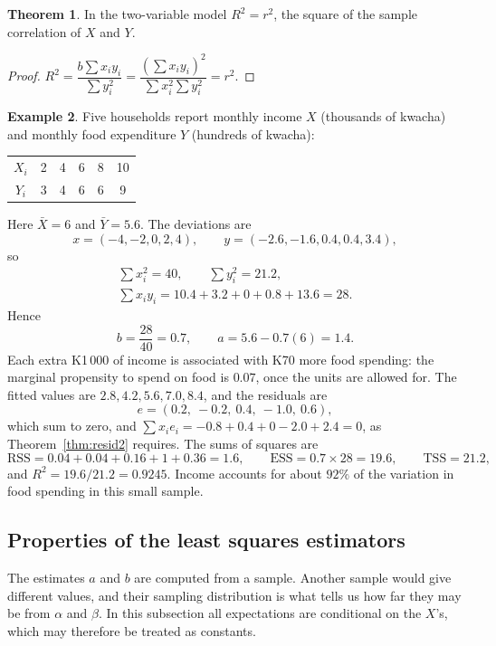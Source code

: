 \documentclass[11pt,a4paper]{article}
\numberwithin{equation}{section}
\theoremstyle{definition}
\newtheorem{thm}{Theorem}[subsection]
\newtheorem{exa}[thm]{Example}
\begin{document}
\begin{thm}
\label{thm:r2r}
In the two-variable model $R^2 = r^2$, the square of the sample correlation of $X$ and $Y$.
\end{thm}

\begin{proof}
$R^2 = \dfrac{b\sum x_iy_i}{\sum y_i^2} = \dfrac{(\sum x_iy_i)^2}{\sum x_i^2\sum y_i^2} = r^2$.
\end{proof}

\begin{exa}
\label{ex:hand2}
Five households report monthly income $X$ (thousands of kwacha) and monthly food expenditure $Y$ (hundreds of kwacha):
\begin{center}
\begin{tabular}{c|ccccc}
$X_i$ & 2 & 4 & 6 & 8 & 10\\
$Y_i$ & 3 & 4 & 6 & 6 & 9
\end{tabular}
\end{center}
Here $\bar X = 6$ and $\bar Y = 5.6$. The deviations are
\[
x = (-4, -2, 0, 2, 4), \qquad y = (-2.6, -1.6, 0.4, 0.4, 3.4),
\]
so
\begin{gather*}
\sum x_i^2 = 40, \qquad \sum y_i^2 = 21.2,\\
\sum x_iy_i = 10.4 + 3.2 + 0 + 0.8 + 13.6 = 28 .
\end{gather*}
Hence
\[
b = \frac{28}{40} = 0.7, \qquad a = 5.6 - 0.7(6) = 1.4 .
\]
Each extra K1\,000 of income is associated with K70 more food spending: the marginal propensity to spend on food is $0.07$, once the units are
allowed for. The fitted values are $2.8, 4.2, 5.6, 7.0, 8.4$, and the residuals are
\[
e = (0.2,\ -0.2,\ 0.4,\ -1.0,\ 0.6),
\]
which sum to zero, and $\sum x_ie_i = -0.8 + 0.4 + 0 - 2.0 + 2.4 = 0$, as Theorem~\ref{thm:resid2} requires. The sums of squares are
\[
\text{RSS} = 0.04 + 0.04 + 0.16 + 1 + 0.36 = 1.6, \qquad \text{ESS} = 0.7 \times 28 = 19.6, \qquad \text{TSS} = 21.2 ,
\]
and $R^2 = 19.6/21.2 = 0.9245$. Income accounts for about $92\%$ of the variation in food spending in this small sample.
\end{exa}

\subsection{Properties of the least squares estimators}
\label{ssec:prop2}

The estimates $a$ and $b$ are computed from a sample. Another sample would give different values, and their sampling distribution is what tells us
how far they may be from $\alpha$ and $\beta$. In this subsection all expectations are conditional on the $X$'s, which may therefore be treated as
constants.
\end{document}
